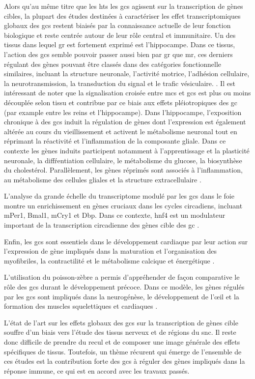 \documentclass[../main.tex]{subfiles}
\begin{document}
Alors qu'au même titre que les \glspl{ht} les \glspl{gc} agissent sur la transcription de gènes cibles, la plupart des études destinées à caractériser les effet transcriptomiques globaux des \glspl{gc} restent biaisés par la connaissance actuelle de leur fonction biologique et reste centrée autour de leur rôle central et immunitaire.
Un des tissus dans lequel \gls{gr} est fortement exprimé est l'hippocampe.
Dans ce tissus, l'action des \glspl{gc} semble pouvoir passer aussi bien par \gls{gr} que \gls{mr}, ces derniers régulant des gènes pouvant être classés dans des catégories fonctionnelle similaires, incluant la structure neuronale, l'activité motrice, l'adhésion cellulaire, la neurotransmission, la transduction du signal et le trafic vésiculaire. \citep{Datson2001}.
Il est intéressant de noter que la signalisation croisée entre \glspl{mc} et \glspl{gc} est plus ou moins découplée selon tissu et contribue par ce biais aux effets pléiotropiques des \gls{gc} (par example entre les reins et l'hippocampe).
Dans l'hippocampe, l'exposition chronique à des \glspl{gc} induit la régulation de gènes dont l'expression est également altérée au cours du vieillissement et activent le métabolisme neuronal tout en réprimant la réactivité et l'inflammation de la composante gliale.
Dans ce contexte les gènes induits participent notamment à l'apprentissage et la plasticité neuronale, la diffŕentiation cellulaire, le métabolisme du glucose, la biosynthèse du cholestérol.
Parallèlement, les gènes réprimés sont associés à l'inflammation, au métabolisme des cellules gliales et la structure extracellulaire \citep{Chen2013b,Carter2012}.
\par
L'analyse da grande échelle du transcriptome modulé par les \glspl{gc} dans le foie montre un enrichissement en gènes cruciaux dans les cycles circadiens, incluant mPer1, Bmal1, mCry1 et Dbp.
Dans ce contexte, \gls{hnf4} est un modulateur important de la transcription circadienne des gènes cible des \gls{gc} \citep{Reddy2007}.
\par
Enfin, les \glspl{gc} sont essentiels dans le développement cardiaque par leur action sur l'expression de gène impliqués dans la maturation et l'organisation des myofibriles, la contractilité et le métabolisme calcique et énergétique \cite{Rog-Zielinska2013}.
\par
L'utilisation du poisson-zèbre a permis d'appréhender de façon comparative le rôle des \glspl{gc} durant le développement précoce.
Dans ce modèle, les gènes régulés par les \glspl{gc} sont impliqués dans la neurogénèse, le développement de l'œil et la formation des muscles squelettiques et cardiaques \citep{Nesan2013}.
\par
L'état de l'art sur les effets globaux des \glspl{gc} sur la transcription de gènes cible souffre d'un biais vers l'étude des tissus nerveux et de régions du \gls{snc}.
Il reste donc difficile de prendre du recul et de composer une image générale des effets spécifiques de tissus.
Toutefois, un thème récurent qui émerge de l'ensemble de ces études est la contribution forte des \glspl{gc} à réguler des gènes impliqués dans la réponse immune, ce qui est en accord avec les travaux passés.

\end{document}
